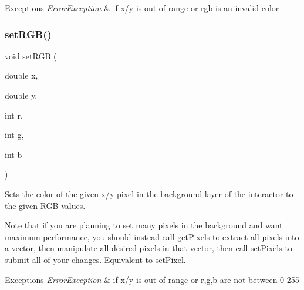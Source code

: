 \begin{DoxyExceptions}{Exceptions}
{\em Error\+Exception} & if x/y is out of range or rgb is an invalid color \\
\hline
\end{DoxyExceptions}
\mbox{\label{classsgl_1_1GDrawingSurface_a81202471d4fc9f2015aef0bc073acfab}} 
\subsubsection{\texorpdfstring{set\+R\+G\+B()}{setRGB()}\hspace{0.1cm}{\footnotesize\ttfamily [2/3]}}
{\footnotesize\ttfamily void set\+R\+GB (\begin{DoxyParamCaption}\item[{double}]{x,  }\item[{double}]{y,  }\item[{int}]{r,  }\item[{int}]{g,  }\item[{int}]{b }\end{DoxyParamCaption})\hspace{0.3cm}{\ttfamily [virtual]}}



Sets the color of the given x/y pixel in the background layer of the interactor to the given R\+GB values. 

Note that if you are planning to set many pixels in the background and want maximum performance, you should instead call get\+Pixels to extract all pixels into a vector, then manipulate all desired pixels in that vector, then call set\+Pixels to submit all of your changes. Equivalent to set\+Pixel.


\begin{DoxyExceptions}{Exceptions}
{\em Error\+Exception} & if x/y is out of range or r,g,b are not between 0-\/255 \\
\hline
\end{DoxyExceptions}
\mbox{\label{classsgl_1_1GDrawingSurface_ae9a228792d4bb4b628350f39eaa3ad12}} 
